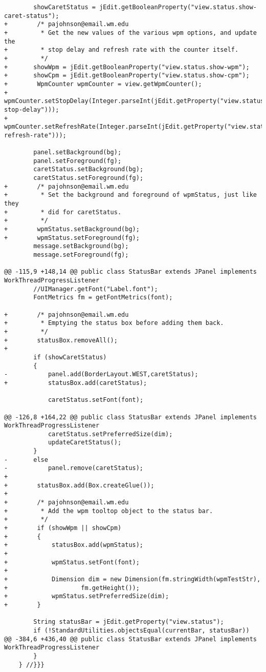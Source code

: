 \documentclass[12pt]{article}
\begin{document}
\begin{verbatim}
 		showCaretStatus = jEdit.getBooleanProperty("view.status.show-caret-status");
+        /* pajohnson@email.wm.edu
+         * Get the new values of the various wpm options, and update the
+         * stop delay and refresh rate with the counter itself.
+         */
+		showWpm = jEdit.getBooleanProperty("view.status.show-wpm");
+		showCpm = jEdit.getBooleanProperty("view.status.show-cpm");
+        WpmCounter wpmCounter = view.getWpmCounter();
+        wpmCounter.setStopDelay(Integer.parseInt(jEdit.getProperty("view.status.wpm-stop-delay")));
+        wpmCounter.setRefreshRate(Integer.parseInt(jEdit.getProperty("view.status.wpm-refresh-rate")));
 
 		panel.setBackground(bg);
 		panel.setForeground(fg);
 		caretStatus.setBackground(bg);
 		caretStatus.setForeground(fg);
+        /* pajohnson@email.wm.edu
+         * Set the background and foreground of wpmStatus, just like they
+         * did for caretStatus.
+         */
+        wpmStatus.setBackground(bg);
+        wpmStatus.setForeground(fg);
 		message.setBackground(bg);
 		message.setForeground(fg);
 
@@ -115,9 +148,14 @@ public class StatusBar extends JPanel implements WorkThreadProgressListener
 		//UIManager.getFont("Label.font");
 		FontMetrics fm = getFontMetrics(font);
 
+        /* pajohnson@email.wm.edu
+         * Emptying the status box before adding them back.
+         */
+        statusBox.removeAll();
+
 		if (showCaretStatus)
 		{
-			panel.add(BorderLayout.WEST,caretStatus);
+			statusBox.add(caretStatus);
 
 			caretStatus.setFont(font);
 
@@ -126,8 +164,22 @@ public class StatusBar extends JPanel implements WorkThreadProgressListener
 			caretStatus.setPreferredSize(dim);
 			updateCaretStatus();
 		}
-		else
-			panel.remove(caretStatus);
+
+        statusBox.add(Box.createGlue());
+
+        /* pajohnson@email.wm.edu
+         * Add the wpm tooltop object to the status bar.
+         */
+        if (showWpm || showCpm)
+        {
+            statusBox.add(wpmStatus);
+
+            wpmStatus.setFont(font);
+
+            Dimension dim = new Dimension(fm.stringWidth(wpmTestStr),
+                    fm.getHeight());
+            wpmStatus.setPreferredSize(dim);
+        }
 
 		String statusBar = jEdit.getProperty("view.status");
 		if (!StandardUtilities.objectsEqual(currentBar, statusBar))
@@ -384,6 +436,40 @@ public class StatusBar extends JPanel implements WorkThreadProgressListener
  		}			
 	} //}}}
 

\end{verbatim}
\end{document}
